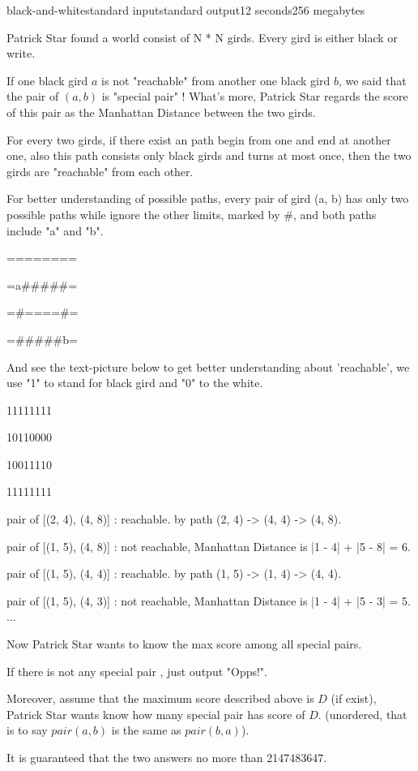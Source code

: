 \begin{problem}{black-and-white}{standard input}{standard output}{12 seconds}{256 megabytes}

Patrick Star found a world consist of N * N girds. Every gird is either black or write.

If one black gird $a$ is not "reachable" from another one black gird $b$, we said that the pair of $(a, b)$ is "special pair" ! What's more, Patrick Star regards the score of this pair as the Manhattan Distance between the two girds.

For every two girds, if there exist an path begin from one and end at another one, also this path consists only black girds and turns at most once, then the two girds are "reachable" from each other.

For better understanding of possible paths, every pair of gird (a, b) has only two possible paths while ignore the other limits, marked by \#, and both paths include "a" and "b".


========

=a#####=

=#====#=

=#####b=


And see the text-picture below to get better understanding about 'reachable', we use "1" to stand for black gird and "0" to the white.

11111111

10110000

10011110

11111111

pair of [(2, 4), (4, 8)] : reachable. by path (2, 4) -> (4, 4) -> (4, 8).

pair of [(1, 5), (4, 8)] : not reachable, Manhattan Distance is |1 - 4| + |5 - 8| = 6.

pair of [(1, 5), (4, 4)] : reachable. by path (1, 5) -> (1, 4) -> (4, 4).

pair of [(1, 5), (4, 3)] : not reachable, Manhattan Distance is |1 - 4| + |5 - 3| = 5.
...


Now Patrick Star wants to know the max score among all special pairs.

If there is not any special pair , just output "Opps!".

Moreover, assume that the maximum score described above is $D$ (if exist), Patrick Star wants know how many special pair has score of $D$. (unordered, that is to say $pair(a, b)$ is the same as $pair(b, a)$).

It is guaranteed that the two answers no more than 2147483647.
 


\end{problem}
